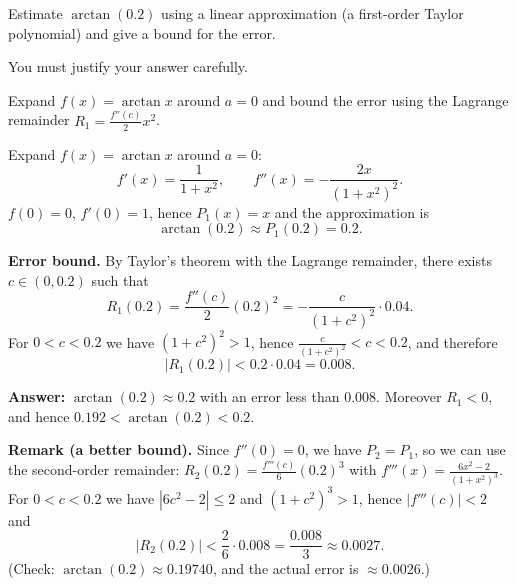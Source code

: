 
\begin{question}
Estimate $\arctan(0.2)$ using a linear approximation (a first-order Taylor polynomial) and give a bound for the error.

You must justify your answer carefully.
\end{question}

\begin{hint}
Expand $f(x)=\arctan x$ around $a=0$ and bound the error using the Lagrange remainder $R_1=\frac{f''(c)}{2}x^2$.
\end{hint}

\begin{solution}
Expand $f(x)=\arctan x$ around $a=0$:
\[ f'(x)=\frac{1}{1+x^2},\qquad f''(x)=-\frac{2x}{(1+x^2)^2}. \]
$f(0)=0$, $f'(0)=1$, hence $P_1(x)=x$ and the approximation is
\[ \arctan(0.2)\approx P_1(0.2)=\boxed{0.2}. \]

\textbf{Error bound.} By Taylor's theorem with the Lagrange remainder, there exists $c\in(0,0.2)$ such that
\[ R_1(0.2)=\frac{f''(c)}{2}(0.2)^2=-\frac{c}{(1+c^2)^2}\cdot0.04. \]
For $0<c<0.2$ we have $(1+c^2)^2>1$, hence $\frac{c}{(1+c^2)^2}<c<0.2$, and therefore
\[ |R_1(0.2)|<0.2\cdot0.04=0.008. \]

\textbf{Answer:} $\arctan(0.2)\approx0.2$ with an error less than $0.008$. Moreover $R_1<0$, and hence $0.192<\arctan(0.2)<0.2$.

\textbf{Remark (a better bound).} Since $f''(0)=0$, we have $P_2=P_1$, so we can use the second-order remainder: $R_2(0.2)=\frac{f'''(c)}{6}(0.2)^3$ with $f'''(x)=\frac{6x^2-2}{(1+x^2)^3}$. For $0<c<0.2$ we have $|6c^2-2|\le 2$ and $(1+c^2)^3>1$, hence $|f'''(c)|<2$ and
\[ |R_2(0.2)|<\frac{2}{6}\cdot0.008=\frac{0.008}{3}\approx0.0027. \]
(Check: $\arctan(0.2)\approx0.19740$, and the actual error is $\approx0.0026$.)
\end{solution}
